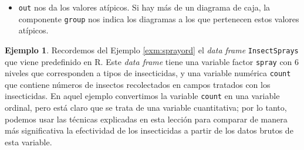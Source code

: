 \documentclass[
]{book}
\newenvironment{Shaded}{\begin{snugshade}}{\end{snugshade}}
\newcommand{\CommentTok}[1]{\textcolor[rgb]{0.56,0.35,0.01}{\textit{#1}}}
\newcommand{\DataTypeTok}[1]{\textcolor[rgb]{0.13,0.29,0.53}{#1}}
\newcommand{\KeywordTok}[1]{\textcolor[rgb]{0.13,0.29,0.53}{\textbf{#1}}}
\newcommand{\NormalTok}[1]{#1}
\newcommand{\OperatorTok}[1]{\textcolor[rgb]{0.81,0.36,0.00}{\textbf{#1}}}
\newcommand{\OtherTok}[1]{\textcolor[rgb]{0.56,0.35,0.01}{#1}}
\providecommand{\tightlist}{%
  \setlength{\itemsep}{0pt}\setlength{\parskip}{0pt}}
\theoremstyle{definition}
\theoremstyle{definition}
\newtheorem{example}{Ejemplo}[chapter]
\theoremstyle{definition}
\theoremstyle{remark}
\begin{document}
\begin{Shaded}
\end{Shaded}

\begin{itemize}
\tightlist
\item
  \texttt{out} nos da los valores atípicos. Si hay más de un diagrama de caja, la componente \texttt{group} nos indica los diagramas a los que pertenecen estos valores atípicos.
\end{itemize}

\begin{Shaded}
\end{Shaded}

\begin{example}
\protect\hypertarget{exm:unnamed-chunk-54}{}{\label{exm:unnamed-chunk-54} }Recordemos del Ejemplo \ref{exm:sprayord} el \emph{data frame} \texttt{InsectSprays} que viene predefinido en R. Este \emph{data frame} tiene una variable factor \texttt{spray} con 6 niveles que corresponden a tipos de insecticidas, y una variable numérica \texttt{count} que contiene números de insectos recolectados en campos tratados con los insecticidas. En aquel ejemplo convertimos la variable \texttt{count} en una variable ordinal, pero está claro que se trata de una variable cuantitativa; por lo tanto, podemos usar las técnicas explicadas en esta lección para comparar de manera más significativa la efectividad de los insecticidas a partir de los datos brutos de esta variable.
\end{example}
\end{document}
